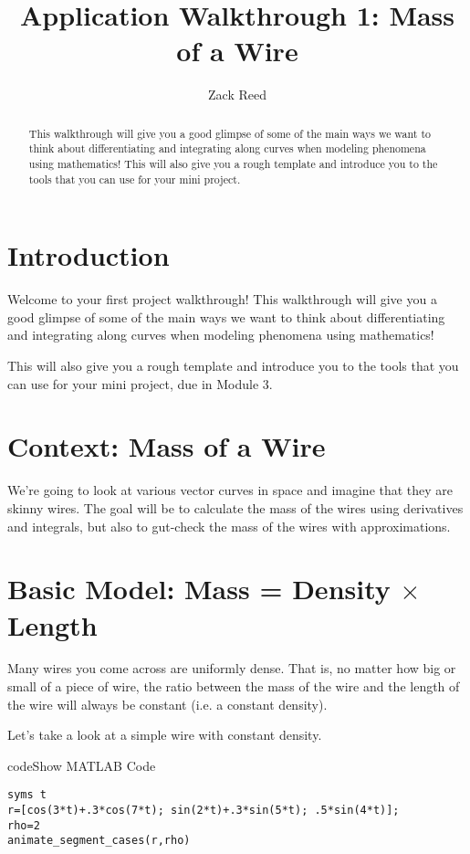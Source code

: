 \documentclass{ximera}
\title{Application Walkthrough 1: Mass of a Wire}
\author{Zack Reed}
\begin{document}
\begin{abstract}
This walkthrough will give you a good glimpse of some of the main ways we want to think about differentiating and integrating along curves when modeling phenomena using mathematics! This will also give you a rough template and introduce you to the tools that you can use for your mini project.
\end{abstract}
\maketitle

\section*{Introduction}

Welcome to your first project walkthrough! This walkthrough will give you a good glimpse of some of the main ways we want to think about differentiating and integrating along curves when modeling phenomena using mathematics! 

This will also give you a rough template and introduce you to the tools that you can use for your mini project, due in Module 3.

\section*{Context: Mass of a Wire}

We're going to look at various vector curves in space and imagine that they are skinny wires. The goal will be to calculate the mass of the wires using derivatives and integrals, but also to gut-check the mass of the wires with approximations.

\section*{Basic Model: Mass = Density $\times$ Length}

Many wires you come across are uniformly dense. That is, no matter how big or small of a piece of wire, the ratio between the mass of the wire and the length of the wire will always be constant (i.e. a constant density).

Let's take a look at a simple wire with constant density.

\begin{expandable}{code}{Show MATLAB Code}
\begin{verbatim}
syms t
r=[cos(3*t)+.3*cos(7*t); sin(2*t)+.3*sin(5*t); .5*sin(4*t)];
rho=2
animate_segment_cases(r,rho)
\end{verbatim}
\end{expandable}
\end{document}
